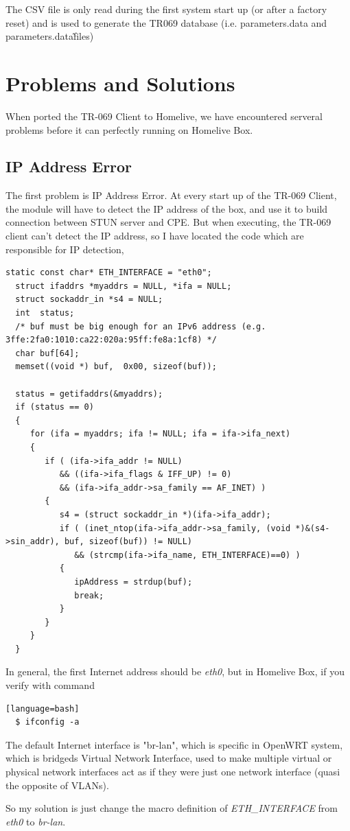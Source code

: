 The CSV file is only read during the first system start up (or after a factory reset) and is used to generate the TR069
database (i.e. parameters.data and parameters.data\~ files)


\section{Problems and Solutions}

When ported the TR-069 Client to Homelive, we have encountered serveral problems before it can perfectly running on Homelive Box.

\subsection{IP Address Error}
The first problem is IP Address Error. At every start up of the TR-069 Client, the module will have to detect the IP address of the box, and use it to build connection between STUN server and CPE. But when executing, the TR-069 client can't detect the IP address, so I have located the code which are responsible for IP detection,

\begin{lstlisting}[mathescape]
  static const char* ETH_INTERFACE = "eth0";
  struct ifaddrs *myaddrs = NULL, *ifa = NULL;
  struct sockaddr_in *s4 = NULL;
  int  status;
  /* buf must be big enough for an IPv6 address (e.g. 3ffe:2fa0:1010:ca22:020a:95ff:fe8a:1cf8) */
  char buf[64];
  memset((void *) buf,  0x00, sizeof(buf));

  status = getifaddrs(&myaddrs);
  if (status == 0)
  {
     for (ifa = myaddrs; ifa != NULL; ifa = ifa->ifa_next)
     {
        if ( (ifa->ifa_addr != NULL)
           && ((ifa->ifa_flags & IFF_UP) != 0)
           && (ifa->ifa_addr->sa_family == AF_INET) )
        {
           s4 = (struct sockaddr_in *)(ifa->ifa_addr);
           if ( (inet_ntop(ifa->ifa_addr->sa_family, (void *)&(s4->sin_addr), buf, sizeof(buf)) != NULL)
              && (strcmp(ifa->ifa_name, ETH_INTERFACE)==0) )
           {
              ipAddress = strdup(buf);
              break;
           }
        }
     }
  }
\end{lstlisting}

In general, the first Internet address should be \textit{eth0}, but in Homelive Box, if you verify with command
\begin{lstlisting}[style=DOS][language=bash]
  $ ifconfig -a
\end{lstlisting}

The default Internet interface is "br-lan", which is specific in OpenWRT system, which is bridgeds Virtual Network Interface, used to make multiple virtual or physical network interfaces act as if they were just one network interface (quasi the opposite of VLANs).

So my solution is just change the macro definition of \textit{ETH_INTERFACE} from \textit{eth0} to \textit{br-lan}.
